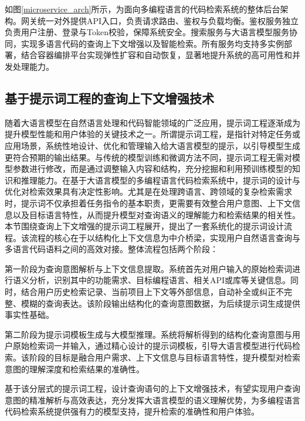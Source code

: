 \documentclass[UTF8,a4paper,12pt]{ctexart}
\numberwithin{equation}{section}
\begin{document}
如图\ref{microservice_arch}所示，为面向多编程语言的代码检索系统的整体后台架构。网关统一对外提供API入口，负责请求路由、鉴权与负载均衡。鉴权服务独立负责用户注册、登录与Token校验，保障系统安全。搜索服务与大语言模型服务协同，实现多语言代码的查询上下文增强以及智能检索。所有服务均支持多实例部署，结合容器编排平台实现弹性扩容和自动恢复，显著地提升系统的高可用性和并发处理能力。\par
\subsection{基于提示词工程的查询上下文增强技术}
随着大语言模型在自然语言处理和代码智能领域的广泛应用，提示词工程逐渐成为提升模型性能和用户体验的关键技术之一。所谓提示词工程，是指针对特定任务或应用场景，系统性地设计、优化和管理输入给大语言模型的提示，以引导模型生成更符合预期的输出结果。与传统的模型训练和微调方法不同，提示词工程无需对模型参数进行修改，而是通过调整输入内容和结构，充分挖掘和利用预训练模型的知识和推理能力。在基于大语言模型的多编程语言代码检索系统中，提示词的设计与优化对检索效果具有决定性影响。尤其是在处理跨语言、跨领域的复杂检索需求时，提示词不仅承担着任务指令的基本职责，更需要有效整合用户意图、上下文信息以及目标语言特性，从而提升模型对查询语义的理解能力和检索结果的相关性。本节围绕查询上下文增强的提示词工程展开，提出了一套系统化的提示词设计流程。该流程的核心在于以结构化上下文信息为中介桥梁，实现用户自然语言查询与多语言代码语料之间的高效对接。整体流程包括两个阶段：\par
第一阶段为查询意图解析与上下文信息提取。系统首先对用户输入的原始检索词进行语义分析，识别其中的功能需求、目标编程语言、相关API或库等关键信息。同时，结合用户历史检索记录、当前项目上下文等外部信息，自动补全或纠正不完整、模糊的查询表达。该阶段输出结构化的查询意图数据，为后续提示词生成提供事实性基础。\par
第二阶段为提示词模板生成与大模型推理。系统将解析得到的结构化查询意图与用户原始检索词一并输入，通过精心设计的提示词模板，引导大语言模型进行代码检索。该阶段的目标是融合用户需求、上下文信息与目标语言特性，提升模型对检索意图的理解深度和检索结果的准确性。\par
基于该分层式的提示词工程，设计查询语句的上下文增强技术，有望实现用户查询意图的精准解析与高效表达，充分发挥大语言模型的语义理解优势，为多编程语言代码检索系统提供强有力的模型支持，提升检索的准确性和用户体验。\par
\end{document}
